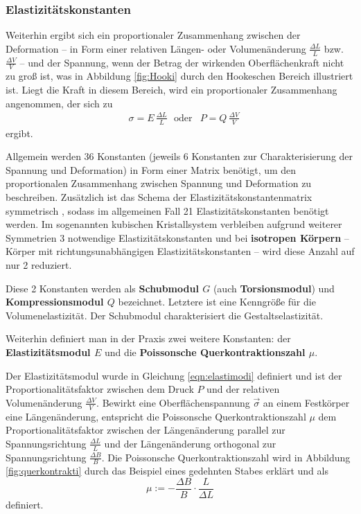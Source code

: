 \subsubsection{Elastizitätskonstanten}
Weiterhin ergibt sich ein proportionaler Zusammenhang zwischen der Deformation -- in Form 
einer relativen Längen- oder Volumenänderung $\frac{\Delta L}{L}$ bzw.
$\frac{\Delta V}{V}$ -- und der Spannung, wenn der Betrag der wirkenden Oberflächenkraft nicht 
zu groß ist, was in Abbildung \ref{fig:Hooki} durch den Hookeschen Bereich illustriert ist.
Liegt die Kraft in diesem Bereich, wird ein proportionaler Zusammenhang angenommen, der sich zu
\begin{align}
	\label{eqn:elastimodi}
	&\sigma = E \, \frac{\Delta L}{L} \,\,\,\, \mathrm{oder}  &P = Q \, \frac{\Delta V}{V}
\end{align}
ergibt.

Allgemein werden 36 Konstanten (jeweils 6 Konstanten zur Charakterisierung der Spannung und
Deformation) in Form einer Matrix benötigt, um den proportionalen Zusammenhang zwischen
Spannung und Deformation zu beschreiben.
Zusätzlich ist das Schema der Elastizitätskonstantenmatrix symmetrisch \cite{Ergebnis der 
exakten Naturwissenschaften vierter band , googlen 21 elastsoooss}, sodass im allgemeinen Fall 
21 Elastizitätskonstanten benötigt werden.
Im sogenannten kubischen Kristallsystem verbleiben aufgrund weiterer Symmetrien 3 notwendige 
Elastizitätskonstanten und bei \textbf{isotropen Körpern} -- Körper mit richtungsunabhängigen 
Elastizitätskonstanten -- wird diese Anzahl auf nur 2 reduziert.

Diese 2 Konstanten werden als \textbf{Schubmodul $G$} (auch \textbf{Torsionsmodul}) und 
\textbf{Kompressionsmodul $Q$} bezeichnet.
Letztere ist eine Kenngröße für die Volumenelastizität. Der Schubmodul charakterisiert die 
Gestaltselastizität.

Weiterhin definiert man in der Praxis zwei weitere Konstanten: der
\textbf{Elastizitätsmodul $E$} und die \textbf{Poissonsche Querkontraktionszahl $\mu$}.

Der Elastizitätsmodul wurde in Gleichung \eqref{eqn:elastimodi} definiert und ist der 
Proportionalitätsfaktor zwischen dem Druck $P$ und der relativen Volumenänderung
$\frac{\Delta V}{V}$.
Bewirkt eine Oberflächenspannung $\vec{\sigma}$ an einem Festkörper eine Längenänderung, 
entspricht die Poissonsche Querkontraktionszahl $\mu$ dem Proportionalitätsfaktor zwischen 
der Längenänderung parallel zur Spannungsrichtung $\frac{\Delta L}{L}$ und der Längenänderung
orthogonal zur Spannungsrichtung $\frac{\Delta B}{B}$. Die Poissonsche Querkontraktionszahl
wird in Abbildung \ref{fig:querkontrakti} durch das Beispiel eines gedehnten Stabes erklärt und
als
\begin{equation*}
	\mu := - \frac{\Delta B}{B} \cdot \frac{L}{\Delta L}
\end{equation*}
definiert.

